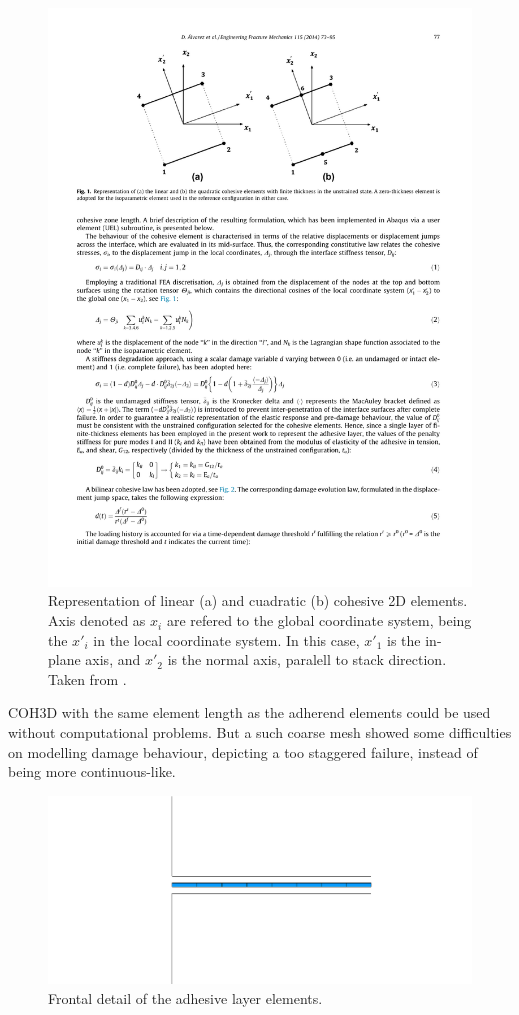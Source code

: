 \documentclass[cmfonts]{witpress}
\begin{document}
\begin{figure}
	\centering
	\includegraphics[width=0.7\linewidth]{figures/IMG_CUTRES/coh3d_csys}
	\caption[Representation of linear and cuadratic cohesive 2D elements.]{Representation of linear (a) and cuadratic (b) cohesive 2D elements. Axis denoted as $x_{i}$ are refered to the global coordinate system, being the $x'_{i}$ in the local coordinate system. In this case, $x'_{1}$ is the in-plane axis, and $x'_{2}$ is the normal axis, paralell to stack direction. Taken from \cite{Alvarez2014}.}
	\label{fig:coh3d_csys}
\end{figure}

COH3D with the same element length as the adherend elements could be used without computational problems. But a such coarse mesh showed some difficulties on modelling damage behaviour, depicting a too staggered failure, instead of being more continuous-like.

\begin{figure}
\centering
\includegraphics[width=0.7\linewidth]{figures/IMG_CUTRES/ads_detail}
\caption{Frontal detail of the adhesive layer elements.}
\label{fig:ads_detail}
\end{figure}
\end{document}
